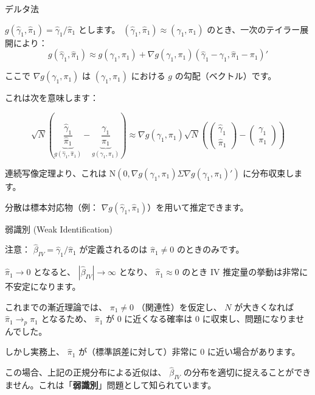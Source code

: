 \documentclass[11pt,handout]{beamer}
\newenvironment{wideitemize}{\itemize\addtolength{\itemsep}{10pt}}{\enditemize}
\begin{document}
\begin{frame}{デルタ法}
	\begin{wideitemize}
	\item
	$g(\hat\gamma_1, \hat\pi_1) = \hat\gamma_1 / \hat\pi_1$ とします。 \pause $(\hat\gamma_1, \hat\pi_1) \approx (\gamma_1, \pi_1)$ のとき、一次のテイラー展開により：
	$$g(\hat\gamma_1, \hat\pi_1) \approx g(\gamma_1,\pi_1) + \nabla g(\gamma_1,\pi_1) (\hat\gamma_1 - \gamma_1, \hat\pi_1 - \pi_1)' $$
	
	\noindent ここで $\nabla g(\gamma_1,\pi_1)$ は $(\gamma_1, \pi_1)$ における $g$ の勾配（ベクトル）です。
	
	\item
	これは次を意味します：
	
	$$\sqrt{N}\left( \underbrace{ \frac{\hat\gamma_1}{\hat\pi_1}}_{g(\hat\gamma_1 , \hat\pi_1)} -  \underbrace{\frac{\gamma_1}{\pi_1} }_{g(\gamma_1,\pi_1)} \right) \approx  \nabla g(\gamma_1, \pi_1)\sqrt{N}\left( \left( \begin{array}{ll} \hat\gamma_1 \\ \hat\pi_1 \end{array} \right)- \left( \begin{array}{ll} \gamma_1 \\ \pi_1 \end{array} \right) \right)  $$
	
	\pause
	\item
	連続写像定理より、これは $\mathrm{N}(0,  \nabla g(\gamma_1, \pi_1) \Sigma  \nabla g(\gamma_1, \pi_1)')$ に分布収束します。
	
	\pause
	\item
	分散は標本対応物（例： $\nabla g(\hat\gamma_1, \hat\pi_1)$）を用いて推定できます。
\end{wideitemize}
\end{frame}

\begin{frame}{弱識別 (Weak Identification)}
	\begin{wideitemize}
		\item
		注意： $\hat\beta_{IV} = \hat\gamma_1 / \hat\pi_1$ が定義されるのは $\hat\pi_1 \neq 0$ のときのみです。
		
		\item
		$\hat\pi_1 \rightarrow 0$ となると、 $|\hat\beta_{IV}| \rightarrow \infty$ となり、 $\hat\pi_1 \approx 0$ のとき IV 推定量の挙動は非常に不安定になります。
		
		\pause
		\item
		これまでの漸近理論では、 $\pi_1 \neq 0$ （関連性）を仮定し、 $N$ が大きくなれば $\hat\pi_1 \rightarrow_p \pi_1$ となるため、 $\hat\pi_1$ が 0 に近くなる確率は 0 に収束し、問題になりませんでした。
		
		\pause
		\item
		しかし実務上、 $\hat\pi_1$ が（標準誤差に対して）非常に 0 に近い場合があります。
		
		\item
		この場合、上記の正規分布による近似は、 $\hat\beta_{IV}$ の分布を適切に捉えることができません。これは「\textbf{弱識別}」問題として知られています。
	\end{wideitemize}
\end{frame}
\end{document}
